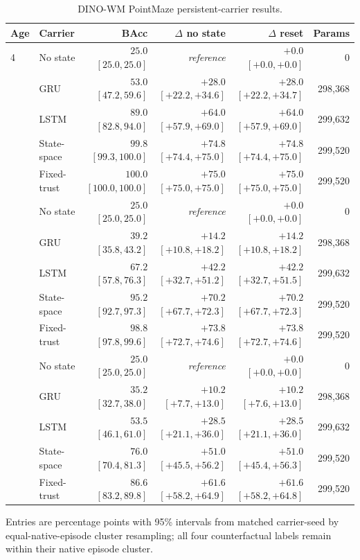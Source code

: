 \begin{table}[H]
\centering
\footnotesize
\setlength{\tabcolsep}{4pt}
\renewcommand{\arraystretch}{1.10}
\caption{DINO-WM PointMaze persistent-carrier results.}
\label{tab:appendix-pointmaze-carriers}
\begin{tabular}{llrrrr}
\toprule
Age & Carrier & BAcc & $\Delta$ no state & $\Delta$ reset & Params \\
\midrule
4 & No state & $25.0$ $[25.0,25.0]$ & \textit{reference} & $+0.0$ $[+0.0,+0.0]$ & 0 \\
 & GRU & $53.0$ $[47.2,59.6]$ & $+28.0$ $[+22.2,+34.6]$ & $+28.0$ $[+22.2,+34.7]$ & 298{,}368 \\
 & LSTM & $89.0$ $[82.8,94.0]$ & $+64.0$ $[+57.9,+69.0]$ & $+64.0$ $[+57.9,+69.0]$ & 299{,}632 \\
 & State-space & $99.8$ $[99.3,100.0]$ & $+74.8$ $[+74.4,+75.0]$ & $+74.8$ $[+74.4,+75.0]$ & 299{,}520 \\
 & Fixed-trust & $100.0$ $[100.0,100.0]$ & $+75.0$ $[+75.0,+75.0]$ & $+75.0$ $[+75.0,+75.0]$ & 299{,}520 \\
\addlinespace[2pt]
8 & No state & $25.0$ $[25.0,25.0]$ & \textit{reference} & $+0.0$ $[+0.0,+0.0]$ & 0 \\
 & GRU & $39.2$ $[35.8,43.2]$ & $+14.2$ $[+10.8,+18.2]$ & $+14.2$ $[+10.8,+18.2]$ & 298{,}368 \\
 & LSTM & $67.2$ $[57.8,76.3]$ & $+42.2$ $[+32.7,+51.2]$ & $+42.2$ $[+32.7,+51.5]$ & 299{,}632 \\
 & State-space & $95.2$ $[92.7,97.3]$ & $+70.2$ $[+67.7,+72.3]$ & $+70.2$ $[+67.7,+72.3]$ & 299{,}520 \\
 & Fixed-trust & $98.8$ $[97.8,99.6]$ & $+73.8$ $[+72.7,+74.6]$ & $+73.8$ $[+72.7,+74.6]$ & 299{,}520 \\
\addlinespace[2pt]
15 & No state & $25.0$ $[25.0,25.0]$ & \textit{reference} & $+0.0$ $[+0.0,+0.0]$ & 0 \\
 & GRU & $35.2$ $[32.7,38.0]$ & $+10.2$ $[+7.7,+13.0]$ & $+10.2$ $[+7.6,+13.0]$ & 298{,}368 \\
 & LSTM & $53.5$ $[46.1,61.0]$ & $+28.5$ $[+21.1,+36.0]$ & $+28.5$ $[+21.1,+36.0]$ & 299{,}632 \\
 & State-space & $76.0$ $[70.4,81.3]$ & $+51.0$ $[+45.5,+56.2]$ & $+51.0$ $[+45.4,+56.3]$ & 299{,}520 \\
 & Fixed-trust & $86.6$ $[83.2,89.8]$ & $+61.6$ $[+58.2,+64.9]$ & $+61.6$ $[+58.2,+64.8]$ & 299{,}520 \\
\bottomrule
\end{tabular}
\vspace{2pt}
\parbox{0.98\textwidth}{\scriptsize Entries are percentage points with 95\% intervals from matched carrier-seed by equal-native-episode cluster resampling; all four counterfactual labels remain within their native episode cluster.}
\end{table}
